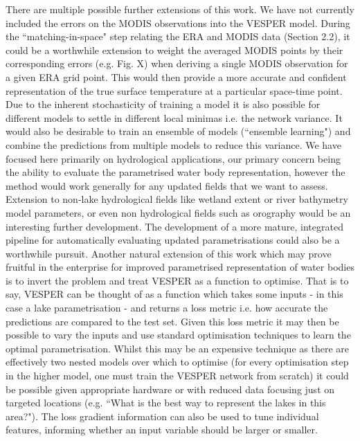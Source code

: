 \documentclass[hess, twostagejnl]{copernicus}
\begin{document}
There are multiple possible further extensions of this work. We have not currently included the errors on the MODIS observations into the VESPER model. During the “matching-in-space" step relating the ERA and MODIS data (Section 2.2), it could be a worthwhile extension to weight the averaged MODIS points by their corresponding errors (e.g. Fig. X) when deriving a single MODIS observation for a given ERA grid point. This would then provide a more accurate and confident representation of the true surface temperature at a particular space-time point. Due to the inherent stochasticity of training a model it is also possible for different models to settle in different local minimas i.e. the network variance. It would also be desirable to train an ensemble of models (“ensemble learning") and combine the predictions from multiple models to reduce this variance. We have focused here primarily on hydrological applications, our primary concern being the ability to evaluate the parametrised water body representation, however the method would work generally for any updated fields that we want to assess. Extension to non-lake hydrological fields like wetland extent or river bathymetry model parameters, or even non hydrological fields such as orography would be an interesting further development. The development of a more mature, integrated pipeline for automatically evaluating updated parametrisations could also be a worthwhile pursuit. Another natural extension of this work which may prove fruitful in the enterprise for improved parametrised representation of water bodies is to invert the problem and treat VESPER as a function to optimise. That is to say, VESPER can be thought of as a function which takes some inputs - in this case a lake parametrisation - and returns a loss metric i.e. how accurate the predictions are compared to the test set. Given this loss metric it may then be possible to vary the inputs and use standard optimisation techniques to learn the optimal parametrisation. Whilst this may be an expensive technique as there are effectively two nested models over which to optimise (for every optimisation step in the higher model, one must train the VESPER network from scratch) it could be possible given appropriate hardware or with reduced data focusing just on targeted locations (e.g. “What is the best way to represent the lakes in this area?"). The loss gradient information can also be used to tune individual features, informing whether an input variable should be larger or smaller.
\end{document}
